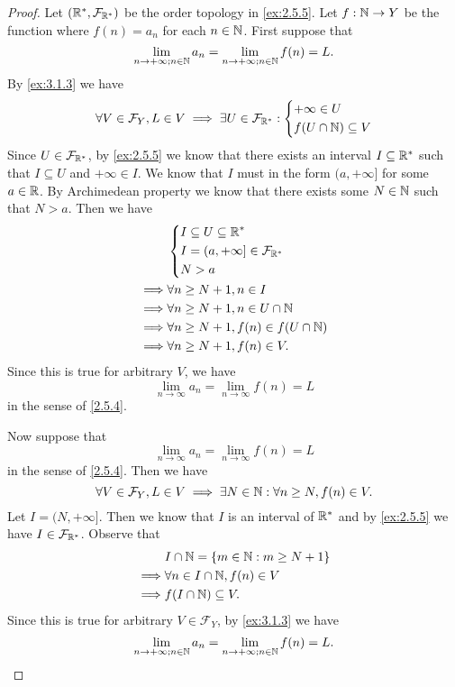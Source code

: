 \begin{proof}
  Let \((\mathbb{R}^*, \mathcal{F}_{\mathbb{R}^*})\) be the order topology in \cref{ex:2.5.5}.
  Let \(f : \mathbb{N} \to Y\) be the function where \(f(n) = a_n\) for each \(n \in \mathbb{N}\).
  First suppose that
  \[
    \lim_{n \to +\infty ; n \in \mathbb{N}} a_n = \lim_{n \to +\infty ; n \in \mathbb{N}} f(n) = L.
  \]
  By \cref{ex:3.1.3} we have
  \[
    \forall V \in \mathcal{F}_Y, L \in V \implies \exists U \in \mathcal{F}_{\mathbb{R}^*} : \begin{dcases}
      +\infty \in U \\
      f(U \cap \mathbb{N}) \subseteq V
    \end{dcases}
  \]
  Since \(U \in \mathcal{F}_{\mathbb{R}^*}\), by \cref{ex:2.5.5} we know that there exists an interval \(I \subseteq \mathbb{R}^*\) such that \(I \subseteq U\) and \(+\infty \in I\).
  We know that \(I\) must in the form \((a, +\infty]\) for some \(a \in \mathbb{R}\).
  By Archimedean property we know that there exists some \(N \in \mathbb{N}\) such that \(N > a\).
  Then we have
  \begin{align*}
             & \begin{dcases}
                 I \subseteq U \subseteq \mathbb{R}^*            \\
                 I = (a, +\infty] \in \mathcal{F}_{\mathbb{R}^*} \\
                 N > a
               \end{dcases}     \\
    \implies & \forall n \geq N + 1, n \in I               \\
    \implies & \forall n \geq N + 1, n \in U \cap \mathbb{N}       \\
    \implies & \forall n \geq N + 1, f(n) \in f(U \cap \mathbb{N}) \\
    \implies & \forall n \geq N + 1, f(n) \in V.
  \end{align*}
  Since this is true for arbitrary \(V\), we have
  \[
    \lim_{n \to \infty} a_n = \lim_{n \to \infty} f(n) = L
  \]
  in the sense of \cref{2.5.4}.

  Now suppose that
  \[
    \lim_{n \to \infty} a_n = \lim_{n \to \infty} f(n) = L
  \]
  in the sense of \cref{2.5.4}.
  Then we have
  \[
    \forall V \in \mathcal{F}_Y, L \in V \implies \exists N \in \mathbb{N} : \forall n \geq N, f(n) \in V.
  \]
  Let \(I = (N, +\infty]\).
  Then we know that \(I\) is an interval of \(\mathbb{R}^*\) and by \cref{ex:2.5.5} we have \(I \in \mathcal{F}_{\mathbb{R}^*}\).
  Observe that
  \begin{align*}
             & I \cap \mathbb{N} = \{m \in \mathbb{N} : m \geq N + 1\} \\
    \implies & \forall n \in I \cap \mathbb{N}, f(n) \in V     \\
    \implies & f(I \cap \mathbb{N}) \subseteq V.
  \end{align*}
  Since this is true for arbitrary \(V \in \mathcal{F}_Y\), by \cref{ex:3.1.3} we have
  \[
    \lim_{n \to +\infty ; n \in \mathbb{N}} a_n = \lim_{n \to +\infty ; n \in \mathbb{N}} f(n) = L.
  \]
\end{proof}

